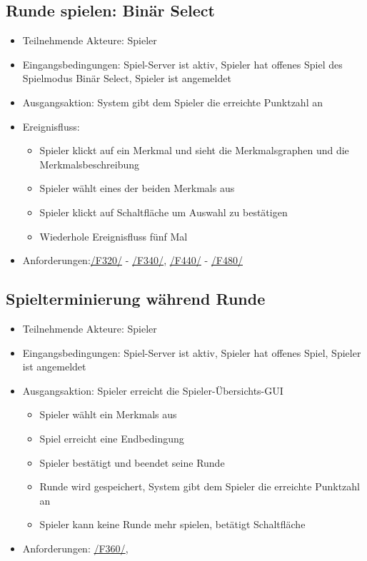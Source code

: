 \documentclass[a4paper]{scrreprt}
\begin{document}
	\subsection{Runde spielen: Binär Select}
	\begin{itemize}
		\item Teilnehmende Akteure: \Gls{Spieler}

		\item Eingangsbedingungen: \Gls{Spiel-Server} ist aktiv, \Gls{Spieler} hat offenes \Gls{Spiel} des \Gls{Spielmodus} Binär Select, \Gls{Spieler} ist angemeldet
        \item Ausgangsaktion: System gibt dem \Gls{Spieler} die erreichte Punktzahl an
		\item Ereignisfluss:
		\begin{itemize}
			\item \Gls{Spieler} klickt auf ein \Gls{Merkmal} und sieht die Merkmalsgraphen und die Merkmalsbeschreibung
			\item \Gls{Spieler} wählt eines der beiden \Glspl{Merkmal} aus
			\item \Gls{Spieler} klickt auf Schaltfläche um Auswahl zu bestätigen
            \item Wiederhole Ereignisfluss fünf Mal
		\end{itemize}
        \item Anforderungen:\hyperlink{F320}{/F320/} - \hyperlink{F340}{/F340/}, \hyperlink{F440}{/F440/} - \hyperlink{F480}{/F480/}
	\end{itemize}

	\subsection{Spielterminierung während Runde}
	\begin{itemize}
		\item Teilnehmende Akteure: \Gls{Spieler}
		\item Eingangsbedingungen: \Gls{Spiel-Server} ist aktiv, \Gls{Spieler} hat offenes \Gls{Spiel}, \Gls{Spieler} ist angemeldet
		\item Ausgangsaktion: \Gls{Spieler} erreicht die Spieler-Übersichts-GUI
		\begin{itemize}
			\item \Gls{Spieler} wählt ein \Glspl{Merkmal} aus
			\item \Gls{Spiel} erreicht eine Endbedingung
			\item \Gls{Spieler} bestätigt und beendet seine Runde
			\item Runde wird gespeichert, System gibt dem \Gls{Spieler} die erreichte Punktzahl an
			\item \Gls{Spieler} kann keine Runde mehr spielen, betätigt Schaltfläche %
		\end{itemize}
		\item Anforderungen: \hyperlink{F360}{/F360/},
	\end{itemize}
\end{document}
